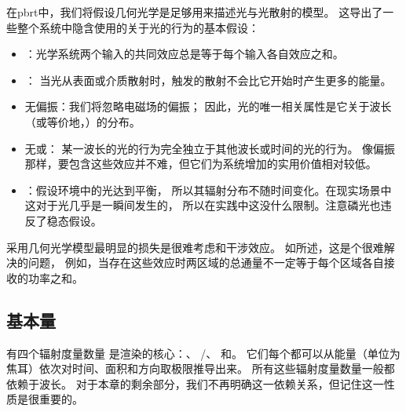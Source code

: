 在pbrt中，我们将假设几何光学是足够用来描述光与光散射的模型。
这导出了一些整个系统中隐含使用的关于光的行为的基本假设：
\begin{itemize}
    \item {}：光学系统两个输入的共同效应总是等于每个输入各自效应之和。
    \item {}：
          当光从表面或介质散射时，触发的散射不会比它开始时产生更多的能量。
    \item {\sffamily 无偏振}：我们将忽略电磁场的偏振；
          因此，光的唯一相关属性是它关于波长（或等价地，）的分布。
    \item {\sffamily 无}或：
          某一波长的光的行为完全独立于其他波长或时间的光的行为。
          像偏振那样，要包含这些效应并不难，但它们为系统增加的实用价值相对较低。
    \item {}：假设环境中的光达到平衡，
          所以其辐射分布不随时间变化。在现实场景中这对于光几乎是一瞬间发生的，
          所以在实践中这没什么限制。注意磷光也违反了稳态假设。
\end{itemize}

采用几何光学模型最明显的损失是很难考虑和干涉效应。
如\citet[p. 24]{PREISENDORFER19653}所述，这是个很难解决的问题，
例如，当存在这些效应时两区域的总通量不一定等于每个区域各自接收的功率之和。

\subsection{基本量}\label{sub:基本量}
有四个辐射度量数量
是渲染的核心：、
/、
和。
它们每个都可以从能量（单位为焦耳）依次对时间、面积和方向取极限推导出来。
所有这些辐射度量数量一般都依赖于波长。
对于本章的剩余部分，我们不再明确这一依赖关系，但记住这一性质是很重要的。

